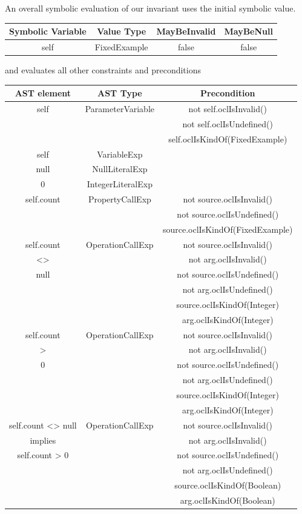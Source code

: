 \documentclass[
]{ceurart}
\begin{document}
An overall symbolic evaluation of our invariant uses the initial symbolic value.
\begin{center}
	\begin{tabular}{|c||c|c||c|}
		\hline
		Symbolic Variable & Value Type & MayBeInvalid & MayBeNull \\
		\hline
		self & FixedExample & false & false \\
		\hline
	\end{tabular}
\end{center}
and evaluates all other constraints and preconditions
\begin{center}
	\begin{tabular}{|c|c||c|}
		\hline
		AST element & AST Type & Precondition \\
		\hline
		\hline
		self & ParameterVariable & not self.oclIsInvalid() \\
		&& not self.oclIsUndefined() \\
		&& self.oclIsKindOf(FixedExample) \\
 		\hline
		self & VariableExp & \\
 		\hline
		null & NullLiteralExp & \\
 		\hline
		0 & IntegerLiteralExp & \\
		\hline
		self.count & PropertyCallExp & not source.oclIsInvalid() \\
		&& not source.oclIsUndefined() \\
		&& source.oclIsKindOf(FixedExample) \\
 		\hline
		self.count & OperationCallExp & not source.oclIsInvalid() \\
		<> && not arg.oclIsInvalid() \\
		null && not source.oclIsUndefined() \\
		&& not arg.oclIsUndefined() \\
		&& source.oclIsKindOf(Integer) \\
		&& arg.oclIsKindOf(Integer) \\
 		\hline
        self.count & OperationCallExp & not source.oclIsInvalid() \\
		> && not arg.oclIsInvalid() \\
		0 && not source.oclIsUndefined() \\
		&& not arg.oclIsUndefined() \\
		&& source.oclIsKindOf(Integer) \\
		&& arg.oclIsKindOf(Integer) \\
 		\hline
        self.count <> null & OperationCallExp & not source.oclIsInvalid() \\
		implies && not arg.oclIsInvalid() \\
		self.count > 0 && not source.oclIsUndefined() \\
		&& not arg.oclIsUndefined() \\
		&& source.oclIsKindOf(Boolean) \\
		&& arg.oclIsKindOf(Boolean) \\
		\hline
	\end{tabular}
\end{center}
\end{document}
